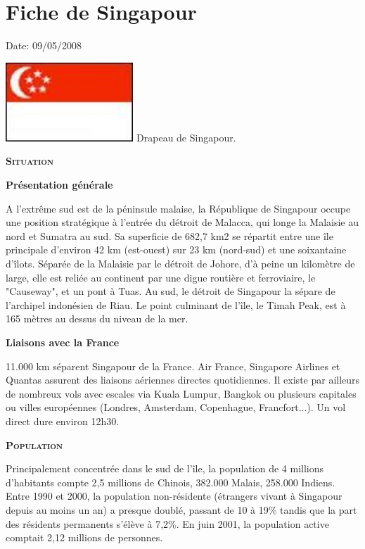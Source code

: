 \section{Fiche de Singapour}

Date: 09/05/2008

\begin{multicols}{2}

\hspace*{-0.65cm}
\includegraphics[width=4.8cm]{articles/Fiche-de-singapour/1210328633arj0.jpg}
Drapeau de Singapour.


\textbf{\textsc{Situation}}

\textbf{Présentation générale}

A l'extrême sud est de la péninsule malaise, la République de Singapour occupe une position stratégique à l'entrée du détroit de Malacca, qui longe la Malaisie au nord et Sumatra au sud. Sa superficie de 682,7 km2 se répartit entre une île principale d'environ 42 km (est-ouest) sur 23 km (nord-sud) et une soixantaine d'îlots. Séparée de la Malaisie par le détroit de Johore, d'à peine un kilomètre de large, elle est reliée au continent par une digue routière et ferroviaire, le "Causeway", et un pont à Tuas. Au sud, le détroit de Singapour la sépare de l'archipel indonésien de Riau. Le point culminant de l'île, le Timah Peak, est à 165 mètres au dessus du niveau de la mer.

\textbf{Liaisons avec la France}

11.000 km séparent Singapour de la France. Air France, Singapore Airlines et Quantas assurent des liaisons aériennes directes quotidiennes. Il existe par ailleurs de nombreux vols avec escales via Kuala Lumpur, Bangkok ou plusieurs capitales ou villes européennes (Londres, Amsterdam, Copenhague, Francfort...). Un vol direct dure environ 12h30.

\textbf{\textsc{Population}}

Principalement concentrée dans le sud de l'île, la population de 4 millions d'habitants compte 2,5 millions de Chinois, 382.000 Malais, 258.000 Indiens. Entre 1990 et 2000, la population non-résidente (étrangers vivant à Singapour depuis au moins un an) a presque doublé, passant de 10 à 19\% tandis que la part des résidents permanents s'élève à 7,2\%. En juin 2001, la population active comptait 2,12 millions de personnes.


\end{multicols}
